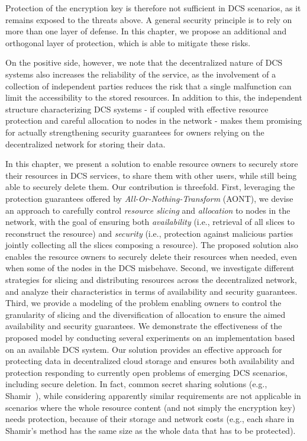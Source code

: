 Protection of the encryption key is therefore not sufficient in DCS
scenarios, as it remains exposed to the threats above. A general
security principle is to rely on more than one layer of defense.  In
this chapter, we propose an additional and orthogonal layer of
protection, which is able to mitigate these risks.

On the positive side, however, we note that the decentralized nature
of DCS systems also increases the reliability of the service, as the
involvement of a collection of independent parties reduces the risk
that a single malfunction can limit the accessibility to the stored
resources. In addition to this, the independent structure
characterizing DCS systems - if coupled with effective resource
protection and careful allocation to nodes in the network - makes them
promising for actually strengthening security guarantees for owners
relying on the decentralized network for storing their data.

In this chapter, we present a solution to enable resource owners to
securely store their resources in DCS services, to share them with
other users, while still being able to securely delete them. Our
contribution is threefold. First, leveraging the protection guarantees
offered by {\em All-Or-Nothing-Transform\/} (AONT), we devise an
approach to carefully control {\em resource slicing\/} and {\em
  allocation\/} to nodes in the network, with the goal of ensuring
both {\em availability} (i.e., retrieval of all slices to reconstruct
the resource) and {\em security} (i.e., protection against malicious
parties jointly collecting all the slices composing a resource). The
proposed solution also enables the resource owners to securely delete
their resources when needed, even when some of the nodes in the DCS
misbehave.  Second, we investigate different strategies for slicing
and distributing resources across the decentralized network, and
analyze their characteristics in terms of availability and security
guarantees. Third, we provide a modeling of the problem enabling
owners to control the granularity of slicing and the diversification
of allocation to ensure the aimed availability and security
guarantees. We demonstrate the effectiveness of the proposed model by
conducting several experiments on an implementation based on an
available DCS system.  Our solution provides an effective approach for
protecting data in decentralized cloud storage and ensures both
availability and protection responding to currently open problems of
emerging DCS scenarios, including secure deletion. In fact, common
secret sharing solutions (e.g., Shamir~\cite{Shamir:1979:SS:359168.359176}), while
considering apparently similar requirements are not applicable in
scenarios where the whole resource content (and not simply the
encryption key) needs protection, because of their storage and network
costs (e.g., each share in Shamir's method has the same size as the
whole data that has to be protected).

